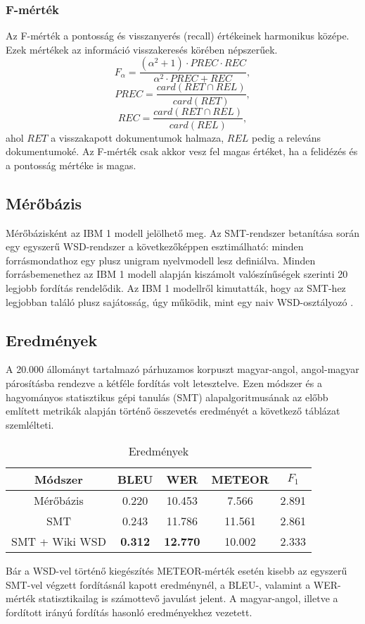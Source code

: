 \subsubsection{F-mérték}
Az F-mérték a pontosság és visszanyerés (recall) értékeinek harmonikus középe. Ezek mértékek az információ visszakeresés körében népszerűek. 
\begin{equation}
F_\alpha = \frac{(\alpha^2 + 1) \cdot PREC \cdot REC}{\alpha^2 \cdot PREC + REC},
\end{equation}
\begin{equation}
PREC = \frac{card(RET \cap REL)}{card(RET)},
\end{equation}
\begin{equation}
REC = \frac{card(RET \cap REL)}{card(REL)},
\end{equation}
ahol $RET$ a visszakapott dokumentumok halmaza, $REL$ pedig a releváns dokumentumoké. Az F-mérték csak akkor vesz fel magas értéket, ha a felidézés és a pontosság mértéke is magas.


\subsection{Mérőbázis}
Mérőbázisként az IBM 1 \cite{Collins} modell jelölhető meg. Az SMT-rendszer betanítása során egy egyszerű WSD-rendszer a következőképpen esztimálható: minden forrásmondathoz egy plusz unigram nyelvmodell lesz definiálva. Minden forrásbemenethez az IBM 1 modell alapján kiszámolt valószínűségek szerinti 20 legjobb fordítás rendelődik. Az IBM 1 modellről kimutatták, hogy az SMT-hez legjobban találó plusz sajátosság, úgy működik, mint egy naiv WSD-osztályozó \cite{Crego10local}.

\subsection{Eredmények}
A 20.000 állományt tartalmazó párhuzamos korpuszt magyar-angol, angol-magyar párosításba rendezve a kétféle fordítás volt letesztelve. Ezen módszer és a hagyományos statisztikus gépi tanulás (SMT) alapalgoritmusának az előbb említett metrikák alapján történő összevetés eredményét a következő táblázat szemlélteti.

\begin{table}[h!]
\centering
\normalsize
 \begin{tabular}{| c | c | c | c | c |} 
 \hline
 Módszer & BLEU & WER & METEOR & $F_1$ \\
 \hline\hline
 Mérőbázis &  0.220 & 10.453 & 7.566 & 2.891\\
 \hline
 SMT &  0.243 & 11.786 & 11.561 & 2.861\\ 
 
 SMT + Wiki WSD &  \textbf{0.312} & \textbf{12.770} & 10.002 & 2.333 \\ 
 \hline
 \end{tabular}
 \caption{Eredmények}
\end{table}

 Bár a WSD-vel történő kiegészítés METEOR-mérték esetén kisebb az egyszerű SMT-vel végzett fordításnál kapott eredménynél, a BLEU-, valamint a WER-mérték statisztikailag is számottevő javulást jelent. A magyar-angol, illetve a fordított irányú fordítás hasonló eredményekhez vezetett.

